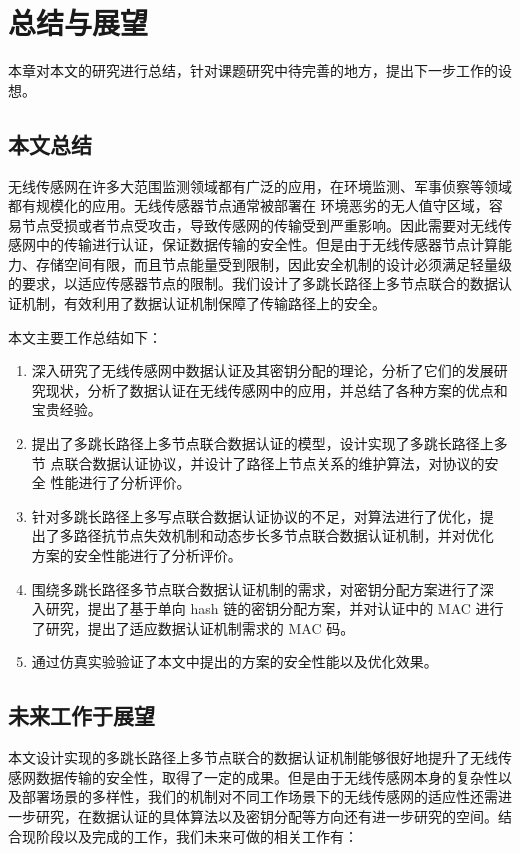 \chapter{总结与展望}
本章对本文的研究进行总结，针对课题研究中待完善的地方，提出下一步工作的设想。
\section{本文总结}
无线传感网在许多大范围监测领域都有广泛的应用，在环境监测、军事侦察等领域都有规模化的应用。无线传感器节点通常被部署在
环境恶劣的无人值守区域，容易节点受损或者节点受攻击，导致传感网的传输受到严重影响。因此需要对无线传感网中的传输进行认证，保证数据传输的安全性。但是由于无线传感器节点计算能力、存储空间有限，而且节点能量受到限制，因此安全机制的设计必须满足轻量级的要求，以适应传感器节点的限制。我们设计了多跳长路径上多节点联合的数据认证机制，有效利用了数据认证机制保障了传输路径上的安全。

本文主要工作总结如下：
\begin{enumerate}\setlength{\itemsep}{-\itemsep}
  \item 深入研究了无线传感网中数据认证及其密钥分配的理论，分析了它们的发展研究现状，分析了数据认证在无线传感网中的应用，并总结了各种方案的优点和宝贵经验。
  \item 提出了多跳长路径上多节点联合数据认证的模型，设计实现了多跳长路径上多节
        点联合数据认证协议，并设计了路径上节点关系的维护算法，对协议的安全
        性能进行了分析评价。
  \item 针对多跳长路径上多写点联合数据认证协议的不足，对算法进行了优化，提
        出了多路径抗节点失效机制和动态步长多节点联合数据认证机制，并对优化
        方案的安全性能进行了分析评价。
  \item 围绕多跳长路径多节点联合数据认证机制的需求，对密钥分配方案进行了深
        入研究，提出了基于单向 hash 链的密钥分配方案，并对认证中的 MAC 进行
        了研究，提出了适应数据认证机制需求的 MAC 码。
  \item 通过仿真实验验证了本文中提出的方案的安全性能以及优化效果。
\end{enumerate}



\section{未来工作于展望}
本文设计实现的多跳长路径上多节点联合的数据认证机制能够很好地提升了无线传感网数据传输的安全性，取得了一定的成果。但是由于无线传感网本身的复杂性以及部署场景的多样性，我们的机制对不同工作场景下的无线传感网的适应性还需进一步研究，在数据认证的具体算法以及密钥分配等方向还有进一步研究的空间。结合现阶段以及完成的工作，我们未来可做的相关工作有：

